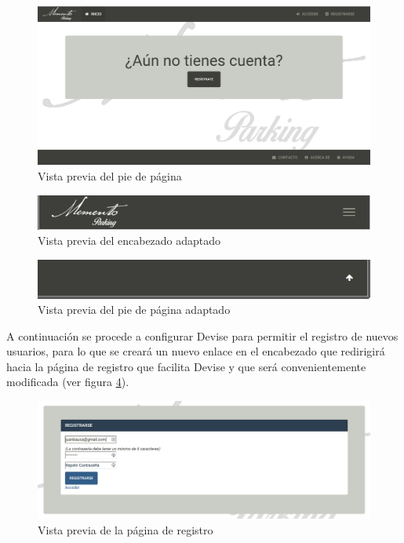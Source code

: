 	\begin{figure}[H]
		\centering
		\includegraphics[width=15cm, fbox={\fboxrule} 4mm]{images/05-resultados/06-acceso_usuarios_3.png}
		\caption{Vista previa del pie de página}
		\label{fig:acceso_usuarios_03}
	\end{figure}

	\begin{figure}[H]
		\centering
		\includegraphics[width=15cm, fbox={\fboxrule} 4mm]{images/05-resultados/07-acceso_usuarios_4.png}
		\caption{Vista previa del encabezado adaptado}
		\label{fig:acceso_usuarios_04}
	\end{figure}
	
		\begin{figure}[H]
		\centering
		\includegraphics[width=15cm, fbox={\fboxrule} 4mm]{images/05-resultados/08-acceso_usuarios_5.png}
		\caption{Vista previa del pie de página adaptado}
		\label{fig:acceso_usuarios_05}
	\end{figure}
	
	
	A continuación se procede a configurar Devise para permitir el registro de nuevos usuarios, para lo que se creará un nuevo enlace en el encabezado que redirigirá hacia la página de registro que facilita Devise y que será convenientemente modificada (ver figura \ref{fig:acceso_usuarios_06}).
	
	
	\begin{figure}[H]
		\centering
		\includegraphics[width=15cm, fbox={\fboxrule} 4mm]{images/05-resultados/09-acceso_usuarios_6.png}
		\caption{Vista previa de la página de registro}
		\label{fig:acceso_usuarios_06}
	\end{figure}
	
